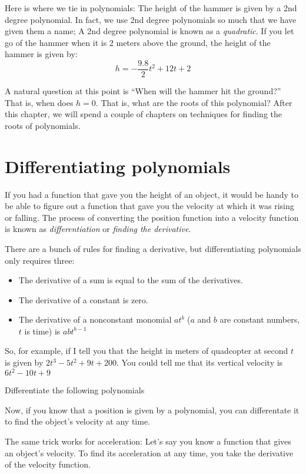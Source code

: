 Here is where we tie in polynomials: The height of the hammer is given
by a 2nd degree polynomial. In fact, we use 2nd degree polynomials so
much that we have given them a name; A 2nd degree polynomial is known
as a \emph{quadratic}. If you let go of the hammer when it is 2 meters
above the ground, the height of the hammer is given by:
\begin{equation*}
  h = -\frac{9.8}{2}t^2 + 12t + 2
\end{equation*}

A natural question at this point is ``When will the hammer hit the
ground?''  That is, when does $h = 0$. That is, what are the roots of
this polynomial? After this chapter, we will spend a couple of
chapters on techniques for finding the roots of polynomials.

\section{Differentiating polynomials}

If you had a function that gave you the height of an object, it would
be handy to be able to figure out a function that gave you the
velocity at which it was rising or falling. The process of converting
the position function into a velocity function is known as
\emph{differentiation} or \emph{finding the derivative}.

There are a bunch of rules for finding a derivative, but
differentiating polynomials only requires three:
\begin{itemize}
\item The derivative of a sum is equal to the sum of the derivatives.
\item The derivative of a constant is zero.
\item The derivative of a nonconstant monomial $at^b$ ($a$ and $b$ are constant numbers, $t$ is time) is $abt^{b-1}$ 
\end{itemize}

So, for example, if I tell you that the height in meters of quadcopter
at second $t$ is given by $2t^3 - 5t^2 + 9t + 200$. You could tell me
that its vertical velocity is $6t^{2} - 10t + 9$

\begin{Exercise}[title={Differentation of polynomials}, label=diffpoly]
  Differentiate the following polynomials
\end{Exercise}
\begin{Answer}
\end{Answer}

Now, if you know that a position is given by a polynomial, you can
differentate it to find the object's velocity at any time.

The same trick works for acceleration: Let's say you know a function
that gives an object's velocity. To find its acceleration at any time,
you take the derivative of the velocity function.
